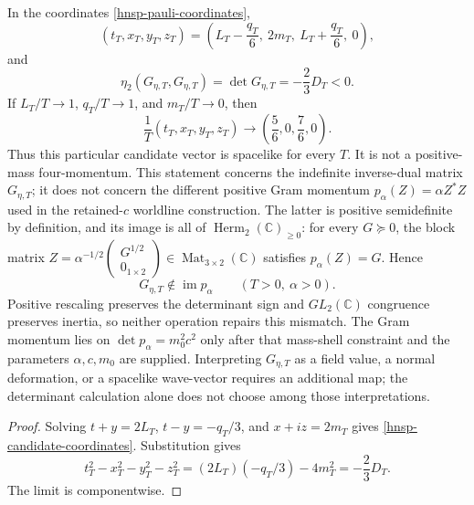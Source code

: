 \begin{proposition}
\label{hnsp-candidate-spacelike}
In the coordinates \eqref{hnsp-pauli-coordinates},
\begin{equation}
 (t_T,x_T,y_T,z_T)
 =\left(L_T-\frac{q_T}{6},\ 2m_T,\ L_T+\frac{q_T}{6},\ 0\right),
 \label{hnsp-candidate-coordinates}
\end{equation}
and
\begin{equation}
 \eta_2(G_{\eta,T},G_{\eta,T})
 =\det G_{\eta,T}=-\frac23D_T<0.
 \label{hnsp-candidate-spacelike-norm}
\end{equation}
If \(L_T/T\to1\), \(q_T/T\to1\), and \(m_T/T\to0\), then
\begin{equation}
 \frac1T(t_T,x_T,y_T,z_T)
 \longrightarrow\left(\frac56,0,\frac76,0\right).
 \label{hnsp-candidate-direction-limit}
\end{equation}
Thus this particular candidate vector is spacelike for every \(T\).  It is
not a positive-mass four-momentum.  This statement concerns the indefinite
inverse-dual matrix \(G_{\eta,T}\); it does not concern the different positive
Gram momentum \(p_\alpha(Z)=\alpha Z^*Z\) used in the retained-\(c\) worldline
construction.  The latter is positive semidefinite by definition, and its
image is all of \(\operatorname{Herm}_2(\mathbb C)_{\geq0}\): for every
\(G\succeq0\), the block matrix
\(
 Z=\alpha^{-1/2}
 \left(\begin{smallmatrix}G^{1/2}\\0_{1\times2}\end{smallmatrix}\right)
 \in\operatorname{Mat}_{3\times2}(\mathbb C)
\)
satisfies \(p_\alpha(Z)=G\).  Hence
\[
 G_{\eta,T}\notin\operatorname{im}p_\alpha
 \qquad(T>0,\ \alpha>0).
\]
Positive rescaling preserves the determinant sign and \(GL_2(\mathbb C)\)
congruence preserves inertia, so neither operation repairs this mismatch.
The Gram momentum lies on \(\det p_\alpha=m_0^2c^2\) only after that
mass-shell constraint and the parameters \(\alpha,c,m_0\) are supplied.
Interpreting \(G_{\eta,T}\) as a field value, a normal deformation, or a
spacelike wave-vector requires an additional map; the determinant calculation
alone does not choose among those interpretations.
\end{proposition}

\begin{proof}
Solving \(t+y=2L_T\), \(t-y=-q_T/3\), and
\(x+iz=2m_T\) gives \eqref{hnsp-candidate-coordinates}.  Substitution gives
\[
 t_T^2-x_T^2-y_T^2-z_T^2
 =(2L_T)(-q_T/3)-4m_T^2=-\frac23D_T.
\]
The limit is componentwise.
\end{proof}

